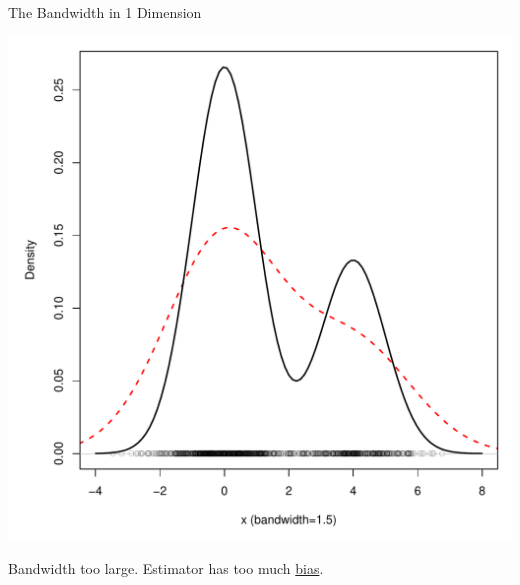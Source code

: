 \documentclass[12pt]{beamer}
\begin{document}
\begin{frame}{The Bandwidth in 1 Dimension}


  \begin{center}
    \includegraphics[scale=0.4]{figs/density3_1.pdf}
    \end{center}

\vspace{-.2in}

\begin{center}
  Bandwidth too large. Estimator has too much \underline{bias}.
\end{center}

  
\end{frame}
\end{document}
